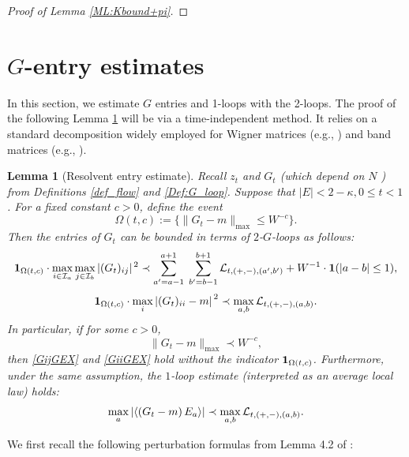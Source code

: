 \documentclass[10pt,reqno]{article}
\theoremstyle{plain} %
\newtheorem{lemma}[theorem]{Lemma}
\theoremstyle{remark}
\numberwithin{equation}{section}
\begin{document}
\begin{proof}[Proof of Lemma  \ref{ML:Kbound+pi}]
\end{proof}
 





\section{\texorpdfstring{$G$}{G}-entry estimates}
  In this section, we estimate $G$ entries and 1-loops with the 2-loops.    The proof  of the following  Lemma \ref{lem_GbEXP} will be via a time-independent method. 
It relies on a standard decomposition widely employed for Wigner matrices (e.g., \cite{erdHos2012rigidity}) and band matrices (e.g., \cite{Average_fluc}).


\begin{lemma}[Resolvent entry estimate]\label{lem_GbEXP}  
Recall   $z_t$ and  $G_t$ (which depend on  $N$ ) from  Definitions \ref{def_flow} and \ref{Def:G_loop}. 
Suppose that $|E| < 2 - \kappa, 0 \leq t <  1$.
For a fixed constant $c > 0$, define the event
\begin{equation}\label{def_asGMc}
    \Omega(t, c) := \big\{\|G_t - m\|_{\max} \leq W^{-c} \big\}.
\end{equation}
Then the entries of $G_t$ can be bounded in terms of $2$-$G$-loops as follows:
\begin{equation}\label{GijGEX}
    {\bf 1}_{\Omega(t, c)} \cdot \max_{i \in {\cal I}_a} \max_{j \in {\cal I}_b} |(G_t)_{ij}|^{\,2} \prec 
    \sum_{a' = a - 1}^{a + 1} \; \sum_{b' = b - 1}^{b + 1} {\cal L}_{t, (+,-), (a', b')}
    + W^{-1} \cdot {\bf 1}(|a - b| \leq 1),
\end{equation}
\begin{equation}\label{GiiGEX}
    {\bf 1}_{\Omega(t, c)} \cdot \max_{i} \left|(G_t)_{ii} - m\right|^{\,2} \prec \max_{a, b} {\cal L}_{t, (+,-), (a, b)}.
\end{equation}
 In particular, if for some $c > 0$, 
\begin{equation}\label{asGMc} 
    \|G_t - m\|_{\max} \prec W^{-c},
\end{equation}
then \eqref{GijGEX} and \eqref{GiiGEX} hold without the indicator ${\bf 1}_{\Omega(t, c)}$. 
Furthermore, under the same assumption, the $1$-loop estimate (interpreted as an average local law) holds:
\begin{equation}\label{GavLGEX}
    \max_{a} \left| \left\langle \left(G_t - m\right) E_a \right\rangle \right| \prec \max_{a, b} {\cal L}_{t, (+,-), (a, b)}.
\end{equation} 
\end{lemma}
 We first recall the following perturbation formulas from  Lemma 4.2 of \cite{erdHos2012bulk}:
\end{document}

